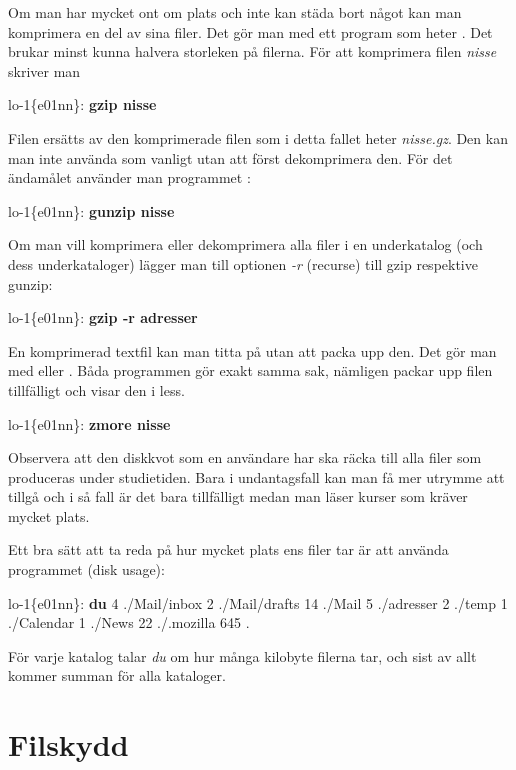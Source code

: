 \documentclass[a4paper,twocolumn]{book}
\begin{document}
Om man har mycket ont om plats och inte kan städa bort något kan man
komprimera en del av
sina filer. Det gör man med ett program som heter . Det
brukar minst kunna halvera storleken på filerna. För att komprimera
filen \emph{nisse} skriver man
\begin{example}
  lo-1\{e01nn\}: \textbf{gzip nisse}
\end{example}
Filen ersätts av den komprimerade filen som i detta fallet heter
\emph{nisse.gz}. Den kan man inte använda som vanligt utan att först
dekomprimera den. För det ändamålet använder man programmet
:
\begin{example}
  lo-1\{e01nn\}: \textbf{gunzip nisse}
\end{example}
Om man vill komprimera eller dekomprimera alla filer i en underkatalog
(och dess underkataloger) lägger man till optionen \emph{-r} (recurse)
till gzip respektive gunzip:
\begin{example}
  lo-1\{e01nn\}: \textbf{gzip -r adresser}
\end{example}
En komprimerad textfil kan man titta på utan att packa upp den. Det
gör man med  eller . Båda programmen gör
exakt samma sak, nämligen packar upp filen tillfälligt och visar den i
less.
\begin{example}
  lo-1\{e01nn\}: \textbf{zmore nisse}
\end{example}

Observera att den diskkvot som en användare har ska räcka till alla
filer som produceras under studietiden. Bara i undantagsfall kan man
få mer utrymme att tillgå och i så fall är det bara tillfälligt medan
man läser kurser som kräver mycket plats.

Ett bra sätt att ta reda på hur mycket plats ens filer tar är att
använda programmet  (disk usage):
\begin{example}
  lo-1\{e01nn\}: \textbf{du}
  4       ./Mail/inbox
  2       ./Mail/drafts
  14      ./Mail
  5       ./adresser
  2       ./temp
  1       ./Calendar
  1       ./News
  22      ./.mozilla
  645     .
\end{example}
För varje katalog talar \emph{du} om hur många kilobyte filerna tar,
och sist av allt kommer summan för alla kataloger.

\section{Filskydd}
\end{document}
